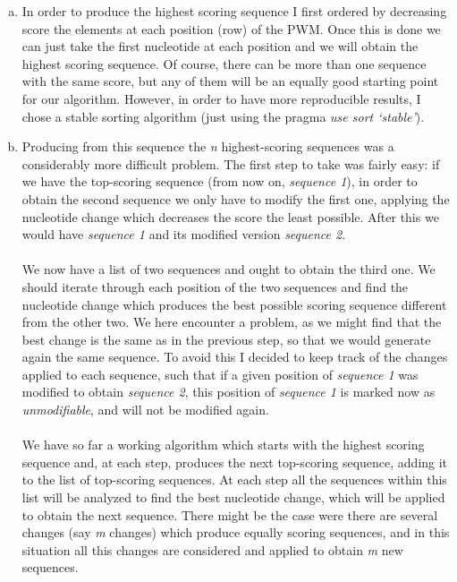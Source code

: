 \documentclass{article}
\begin{document}
\begin{enumerate}[a)]
\item In order to produce the highest scoring sequence I first ordered by decreasing score the elements at each position (row) of the PWM. Once this is done we can just take the first nucleotide at each position and we will obtain the highest scoring sequence. Of course, there can be more than one sequence with the same score, but any of them will be an equally good starting point for our algorithm. However, in order to have more reproducible results, I chose a stable sorting algorithm (just using the pragma \emph{ use sort `stable'}).

\item Producing from this sequence the \emph{n} highest-scoring sequences was a considerably more difficult problem. The first step to take was fairly easy: if we have the top-scoring sequence (from now on, \emph{sequence 1}), in order to obtain the second sequence we only have to modify the first one, applying the nucleotide change which decreases the score the least possible. After this we would have \emph{sequence 1} and its modified version \emph{sequence 2}.\\
\\
We now have a list of two sequences and ought to obtain the third one. We should iterate through each position of the two sequences and find the nucleotide change which produces the best possible scoring sequence different from the other two. We here encounter a problem, as we might find that the best change is the same as in the previous step, so that we would generate again the same sequence. To avoid this I decided to keep track of the changes applied to each sequence, such that if a given position of \emph{sequence 1} was modified to obtain \emph{sequence 2}, this position of \emph{sequence 1} is marked now as \emph{unmodifiable}, and will not be modified again.\\
\\
We have so far a working algorithm which starts with the highest scoring sequence and, at each step, produces the next top-scoring sequence, adding it to the list of top-scoring sequences. At each step all the sequences within this list will be analyzed to find the best nucleotide change, which will be applied to obtain the next sequence. There might be the case were there are several changes (say \emph{m} changes) which produce equally scoring sequences, and in this situation all this changes are considered and applied to obtain \emph{m} new sequences.\\

\end{enumerate}
\end{document}
